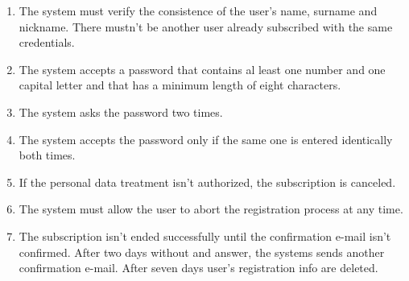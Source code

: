 \begin{enumerate}
\begin{itemize}
    \end{itemize}
    \item The system must verify the consistence of the user's name, surname and nickname. There mustn't be another user already subscribed with the same credentials.
    \item The system accepts a password that contains al least one number and one capital letter and that has a minimum length of eight characters.
    \item The system asks the password two times.
    \item The system accepts the password only if the same one is entered identically both times.
    \item If the personal data treatment isn't authorized, the subscription is canceled.
    \item The system must allow the user to abort the registration process at any time.
    \item The subscription isn't ended successfully until the confirmation e-mail isn't confirmed. After two days without and answer, the systems sends another confirmation e-mail. After seven days user's registration info are deleted.
\end{enumerate}

